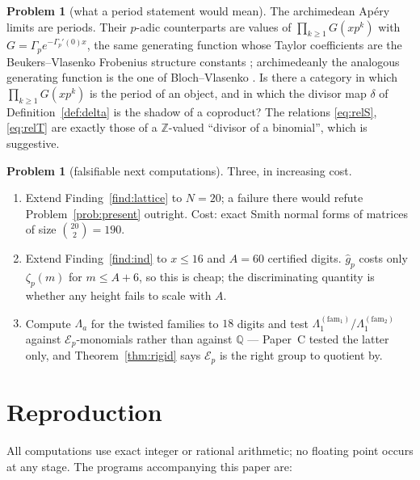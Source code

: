 \documentclass[11pt,reqno]{article}
\newcommand{\QQ}{\mathbb{Q}}
\newcommand{\ZZ}{\mathbb{Z}}
\newcommand{\Gp}{\Gamma_p}
\newcommand{\gh}{\widehat{g}_p}
\newcommand{\El}{\mathcal{E}_p}
\theoremstyle{plain}
\theoremstyle{definition}
\newtheorem{problem}[theorem]{Problem}
\theoremstyle{remark}
\numberwithin{equation}{section}
\begin{document}
\begin{problem}[what a period statement would mean]\label{prob:period}
The archimedean Ap\'ery limits are periods.  Their $p$-adic counterparts are
values of $\prod_{k\ge1}G(xp^k)$ with $G=\Gp e^{-\Gp'(0)x}$, the same generating
function whose Taylor coefficients are the Beukers--Vlasenko Frobenius structure
constants \cite{BV2025}; archimedeanly the analogous generating function is the
one of Bloch--Vlasenko \cite{BlochVlasenko}.  Is there a category in which
$\prod_{k\ge1}G(xp^k)$ is the period of an object, and in which the divisor map
$\delta$ of Definition~\ref{def:delta} is the shadow of a coproduct?  The
relations \eqref{eq:relS}, \eqref{eq:relT} are exactly those of a
$\ZZ$-valued ``divisor of a binomial'', which is suggestive.
\end{problem}

\begin{problem}[falsifiable next computations]\label{prob:next}
Three, in increasing cost.
\begin{enumerate}[label=(\arabic*),leftmargin=2em]
\item Extend Finding~\ref{find:lattice} to $N=20$; a failure there would refute
  Problem~\ref{prob:present} outright.  Cost: exact Smith normal forms of
  matrices of size $\binom{20}{2}=190$.
\item Extend Finding~\ref{find:ind} to $x\le16$ and $A=60$ certified digits.
  $\gh$ costs only $\zeta_p(m)$ for $m\le A+6$, so this is cheap; the
  discriminating quantity is whether any height fails to scale with $A$.
\item Compute $\Lambda_a$ for the twisted families to $18$ digits and test
  $\Lambda^{(\mathrm{fam}_1)}_1/\Lambda^{(\mathrm{fam}_2)}_1$ against
  $\El$-monomials rather than against $\QQ$ --- Paper~C tested the latter only,
  and Theorem~\ref{thm:rigid} says $\El$ is the right group to quotient by.
\end{enumerate}
\end{problem}

\appendix
\section{Reproduction}\label{app:repro}

All computations use exact integer or rational arithmetic; no floating point
occurs at any stage.  The programs accompanying this paper are:
\end{document}
